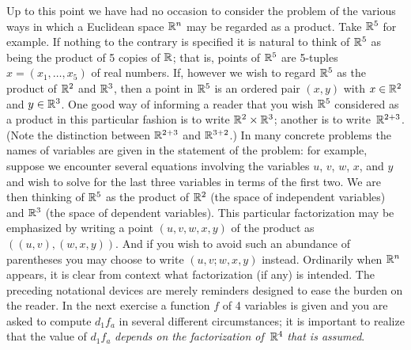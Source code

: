 \begin{notn}  Up to this point we have had no occasion to consider the problem of the various ways
in which a Euclidean space $\mathbb{R}^n$ may be regarded as a product.  Take $\mathbb{R}^5$ for example.  If
nothing to the contrary is specified it is natural to think of $\mathbb{R}^5$ as being the product of
5 copies of $\mathbb{R}$; that is, points of $\mathbb{R}^5$ are 5-tuples $x = (x_1, \dots, x_5)$ of real
numbers.  If, however we wish to regard $\mathbb{R}^5$ as the product of $\mathbb{R}^2$ and $\mathbb{R}^3$, then a
point in $\mathbb{R}^5$ is an ordered pair $(x,y)$ with $x \in \mathbb{R}^2$ and $y \in \mathbb{R}^3$.  One good way
of informing a reader that you wish $\mathbb{R}^5$ considered as a product in this particular fashion
is to write $\mathbb{R}^2 \times \mathbb{R}^3$; another is to
write~$\mathbb{R}^{2+3}$.  (Note the distinction between $\mathbb{R}^{2+3}$  and $\mathbb{R}^{3+2}$.)  In many
concrete problems the names of variables are given in the statement of the problem: for
example, suppose we encounter several equations involving the variables $u$, $v$, $w$, $x$,
and $y$ and wish to solve for the last three variables in terms of the first two.  We are then
thinking of $\mathbb{R}^5$ as the product of $\mathbb{R}^2$ (the space of independent variables) and $\mathbb{R}^3$
(the space of dependent variables).  This particular factorization may be emphasized by
writing a point $(u,v,w,x,y)$ of the product as $((u,v),(w,x,y))$.  And if you wish to avoid
such an abundance of parentheses you may choose to write $(u,v;w,x,y)$ instead. Ordinarily
when $\mathbb{R}^n$ appears, it is clear from context what factorization (if any) is intended.  The
preceding notational devices are merely reminders designed to ease the burden on the reader.
In the next exercise a function $f$ of 4 variables is given and you are asked to compute
$d_1f_a$ in  several different circumstances; it is important to realize that the value of
$d_1f_a$ \emph{depends on the factorization of}~$\mathbb{R}^4$ \emph{that is assumed}.
\end{notn}

